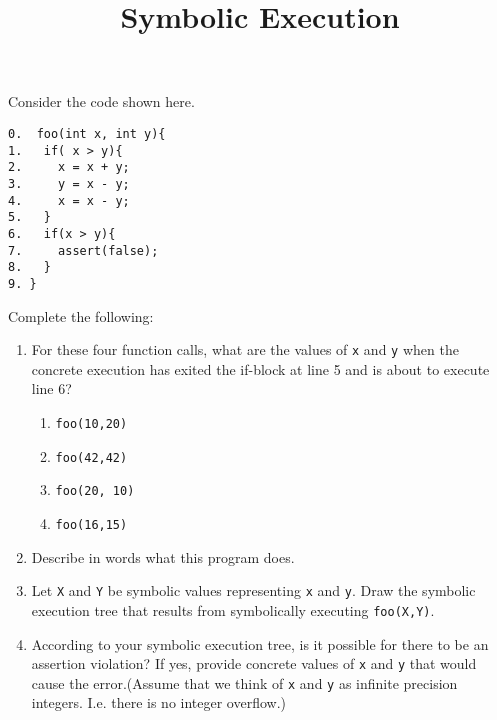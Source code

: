 \documentclass[12pt]{article}
\title{Symbolic Execution}
\date{}
\newenvironment{problem}[2][Problem]{\begin{trivlist}
\item[\hskip \labelsep {\bfseries #1}\hskip \labelsep {\bfseries #2.}]}{\end{trivlist}}
\begin{document}
\maketitle


\begin{problem}{2. Symbolic Execution} Consider the code shown here.

\begin{verbatim}
0.  foo(int x, int y){
1.   if( x > y){
2.     x = x + y;
3.     y = x - y;
4.     x = x - y;
5.   }
6.   if(x > y){
7.     assert(false);
8.   }
9. }
\end{verbatim}

Complete the following:


\begin{enumerate}[label=\roman*.]

\item For these four function calls, what are the values of \texttt{x} and \texttt{y} when the concrete execution has exited the if-block at line 5 and is about to execute line 6?

\begin{multicols}{2}
\begin{enumerate}[label=\alph*.]

\item \texttt{foo(10,20)}
\item \texttt{foo(42,42)}
\item \texttt{foo(20, 10)}
\item \texttt{foo(16,15)}

\end{enumerate}
\end{multicols}

\item Describe in words what this program does.

\item Let \texttt{X} and \texttt{Y} be symbolic values representing \texttt{x} and \texttt{y}. Draw the symbolic execution tree that results from symbolically executing \texttt{foo(X,Y)}.


\item According to your symbolic execution tree, is it possible for there to be an assertion violation? If yes, provide concrete values of \texttt{x} and \texttt{y} that would cause the error.(Assume that we think of \texttt{x} and \texttt{y} as infinite precision integers. I.e. there is no integer overflow.)

\end{enumerate}


\end{problem}
\end{document}
